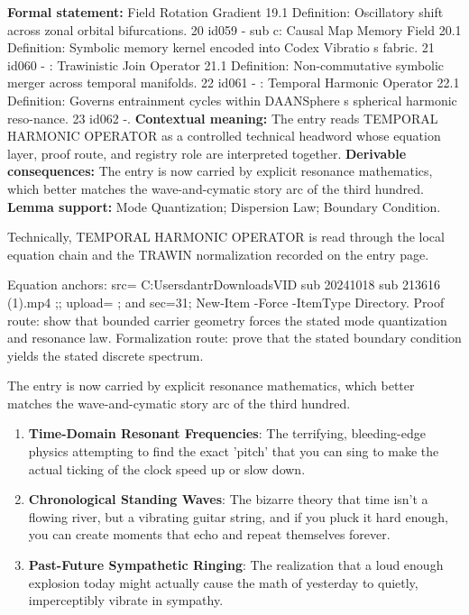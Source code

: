 \begingroup\footnotesize\setlength{\emergencystretch}{3em}\sloppy
\textbf{Formal statement:} Field Rotation Gradient 19.1 Definition: Oscillatory shift across zonal orbital bifurcations. 20 id059 - sub c: Causal Map Memory Field 20.1 Definition: Symbolic memory kernel encoded into Codex Vibratio s fabric. 21 id060 - : Trawinistic Join Operator 21.1 Definition: Non-commutative symbolic merger across temporal manifolds. 22 id061 - : Temporal Harmonic Operator 22.1 Definition: Governs entrainment cycles within DAANSphere s spherical harmonic reso-nance. 23 id062 -. \textbf{Contextual meaning:} The entry reads TEMPORAL HARMONIC OPERATOR as a controlled technical headword whose equation layer, proof route, and registry role are interpreted together. \textbf{Derivable consequences:} The entry is now carried by explicit resonance mathematics, which better matches the wave-and-cymatic story arc of the third hundred. \textbf{Lemma support:} Mode Quantization; Dispersion Law; Boundary Condition.\par
\endgroup

Technically, TEMPORAL HARMONIC OPERATOR is read through the local equation chain and the TRAWIN normalization recorded on the entry page.

Equation anchors: src= C:UsersdantrDownloadsVID sub 20241018 sub 213616 (1).mp4 ;; upload= ; and sec=31; New-Item -Force -ItemType Directory. Proof route: show that bounded carrier geometry forces the stated mode quantization and resonance law. Formalization route: prove that the stated boundary condition yields the stated discrete spectrum.

The entry is now carried by explicit resonance mathematics, which better matches the wave-and-cymatic story arc of the third hundred.
\endgroup

\begin{enumerate}[leftmargin=1.6em,itemsep=6pt,topsep=4pt]
\item \textbf{Time-Domain Resonant Frequencies}: The terrifying, bleeding-edge physics attempting to find the exact 'pitch' that you can sing to make the actual ticking of the clock speed up or slow down.
\item \textbf{Chronological Standing Waves}: The bizarre theory that time isn't a flowing river, but a vibrating guitar string, and if you pluck it hard enough, you can create moments that echo and repeat themselves forever.
\item \textbf{Past-Future Sympathetic Ringing}: The realization that a loud enough explosion today might actually cause the math of yesterday to quietly, imperceptibly vibrate in sympathy.
\end{enumerate}

